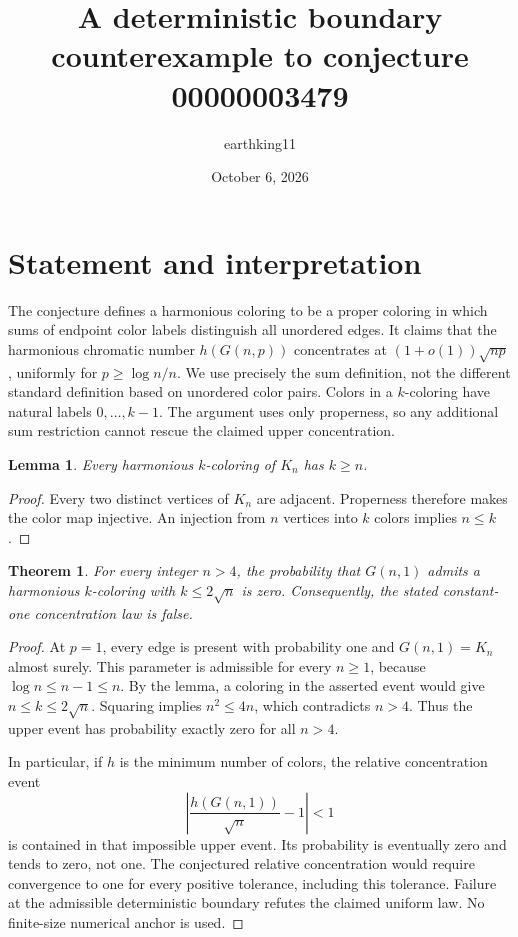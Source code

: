 \documentclass[10pt]{article}
\title{A deterministic boundary counterexample to conjecture 00000003479}
\author{earthking11}
\date{October 6, 2026}
\newtheorem{theorem}{Theorem}
\newtheorem{lemma}{Lemma}
\begin{document}
\maketitle
\section*{Statement and interpretation}
The conjecture defines a harmonious coloring to be a proper coloring in
which sums of endpoint color labels distinguish all unordered edges. It
claims that the harmonious chromatic number $h(G(n,p))$ concentrates at
$(1+o(1))\sqrt{np}$, uniformly for $p\geq \log n/n$. We use precisely the
sum definition, not the different standard definition based on unordered
color pairs. Colors in a $k$-coloring have natural labels $0,\ldots,k-1$.
The argument uses only properness, so any additional sum restriction
cannot rescue the claimed upper concentration.

\begin{lemma}
Every harmonious $k$-coloring of $K_n$ has $k\geq n$.
\end{lemma}
\begin{proof}
Every two distinct vertices of $K_n$ are adjacent. Properness therefore
makes the color map injective. An injection from $n$ vertices into $k$
colors implies $n\leq k$.
\end{proof}

\begin{theorem}
For every integer $n>4$, the probability that $G(n,1)$ admits a harmonious
$k$-coloring with $k\leq 2\sqrt n$ is zero. Consequently, the stated
constant-one concentration law is false.
\end{theorem}
\begin{proof}
At $p=1$, every edge is present with probability one and $G(n,1)=K_n$
almost surely. This parameter is admissible for every $n\geq1$, because
$\log n\leq n-1\leq n$.
By the lemma, a coloring in the asserted event would give
$n\leq k\leq2\sqrt n$. Squaring implies $n^2\leq4n$, which contradicts
$n>4$. Thus the upper event has probability exactly zero for all $n>4$.

In particular, if $h$ is the minimum number of colors, the relative
concentration event
\[
 \left|\frac{h(G(n,1))}{\sqrt n}-1\right|<1
\]
is contained in that impossible upper event. Its probability is eventually
zero and tends to zero, not one. The conjectured relative concentration
would require convergence to one for every positive tolerance, including
this tolerance. Failure at the admissible deterministic boundary refutes
the claimed uniform law. No finite-size numerical anchor is used.
\end{proof}
\end{document}
